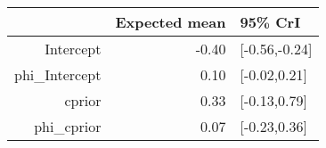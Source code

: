 \begin{tabular}{rrl}
  \hline
 & Expected mean & 95\% CrI \\ 
  \hline
Intercept & -0.40 & [-0.56,-0.24] \\ 
  phi\_Intercept & 0.10 & [-0.02,0.21] \\ 
  cprior & 0.33 & [-0.13,0.79] \\ 
  phi\_cprior & 0.07 & [-0.23,0.36] \\ 
   \hline
\end{tabular}

